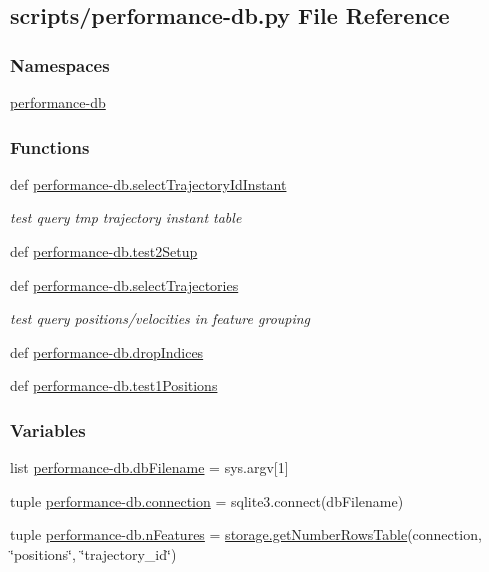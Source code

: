 \hypertarget{performance-db_8py}{\subsection{scripts/performance-\/db.py File Reference}
\label{performance-db_8py}
}
\subsubsection*{Namespaces}
\begin{DoxyCompactItemize}
\item 
\hyperlink{namespaceperformance-db}{performance-\/db}
\end{DoxyCompactItemize}
\subsubsection*{Functions}
\begin{DoxyCompactItemize}
\item 
def \hyperlink{namespaceperformance-db_ac6a284a717787bb2e2296d0caed4918c}{performance-\/db.\-select\-Trajectory\-Id\-Instant}
\begin{DoxyCompactList}\small\item\em test query tmp trajectory instant table \end{DoxyCompactList}\item 
def \hyperlink{namespaceperformance-db_a90fd7556b57603a7d6b053fca334b2ba}{performance-\/db.\-test2\-Setup}
\item 
def \hyperlink{namespaceperformance-db_ac263eb3c8de7eb683d43f0dc6554c7ec}{performance-\/db.\-select\-Trajectories}
\begin{DoxyCompactList}\small\item\em test query positions/velocities in feature grouping \end{DoxyCompactList}\item 
def \hyperlink{namespaceperformance-db_a0a1e5bdd6869001c58701fed27c1a2cd}{performance-\/db.\-drop\-Indices}
\item 
def \hyperlink{namespaceperformance-db_abc61c091eb9ceede04cb3a27f0b774aa}{performance-\/db.\-test1\-Positions}
\end{DoxyCompactItemize}
\subsubsection*{Variables}
\begin{DoxyCompactItemize}
\item 
list \hyperlink{namespaceperformance-db_a283e8388225ac72bea1f9a5b9b7f5ba9}{performance-\/db.\-db\-Filename} = sys.\-argv\mbox{[}1\mbox{]}
\item 
tuple \hyperlink{namespaceperformance-db_ad99932ac08836faca786064c2cc433ee}{performance-\/db.\-connection} = sqlite3.\-connect(db\-Filename)
\item 
tuple \hyperlink{namespaceperformance-db_a0de70b5896e44e6b32b6032bdce46af6}{performance-\/db.\-n\-Features} = \hyperlink{namespacestorage_acb15e4489aa98d2fd2e32b16bc117757}{storage.\-get\-Number\-Rows\-Table}(connection, \char`\"{}positions\char`\"{}, \char`\"{}trajectory\-\_\-id\char`\"{})
\end{DoxyCompactItemize}
